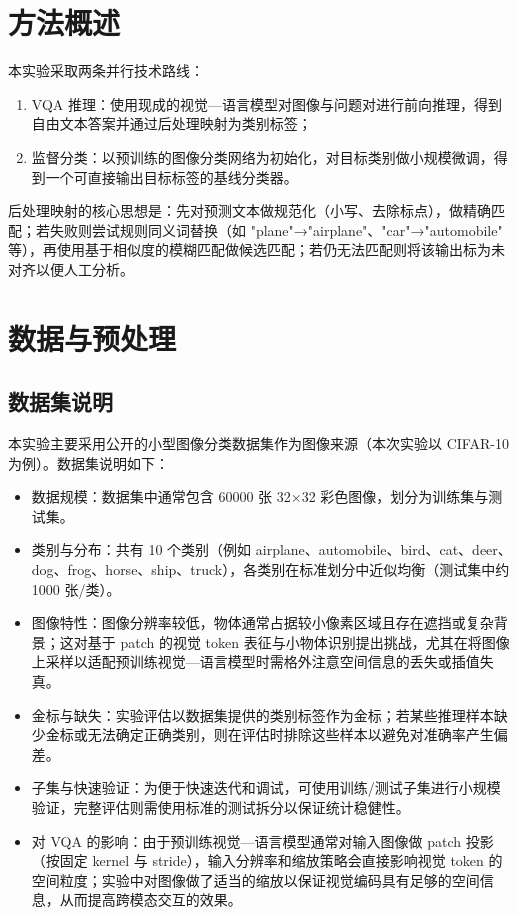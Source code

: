 \section{方法概述}
本实验采取两条并行技术路线：
\begin{enumerate}
  \item VQA 推理：使用现成的视觉—语言模型对图像与问题对进行前向推理，得到自由文本答案并通过后处理映射为类别标签；
  \item 监督分类：以预训练的图像分类网络为初始化，对目标类别做小规模微调，得到一个可直接输出目标标签的基线分类器。
\end{enumerate}

后处理映射的核心思想是：先对预测文本做规范化（小写、去除标点），做精确匹配；若失败则尝试规则同义词替换（如 "plane"→"airplane"、"car"→"automobile" 等），再使用基于相似度的模糊匹配做候选匹配；若仍无法匹配则将该输出标为未对齐以便人工分析。

\section{数据与预处理}
\subsection{数据集说明}
本实验主要采用公开的小型图像分类数据集作为图像来源（本次实验以 CIFAR-10 为例）。数据集说明如下：
\begin{itemize}
  \item 数据规模：数据集中通常包含 60000 张 32$\times$32 彩色图像，划分为训练集与测试集。
  \item 类别与分布：共有 10 个类别（例如 airplane、automobile、bird、cat、deer、dog、frog、horse、ship、truck），各类别在标准划分中近似均衡（测试集中约 1000 张/类）。
  \item 图像特性：图像分辨率较低，物体通常占据较小像素区域且存在遮挡或复杂背景；这对基于 patch 的视觉 token 表征与小物体识别提出挑战，尤其在将图像上采样以适配预训练视觉—语言模型时需格外注意空间信息的丢失或插值失真。
  \item 金标与缺失：实验评估以数据集提供的类别标签作为金标；若某些推理样本缺少金标或无法确定正确类别，则在评估时排除这些样本以避免对准确率产生偏差。
  \item 子集与快速验证：为便于快速迭代和调试，可使用训练/测试子集进行小规模验证，完整评估则需使用标准的测试拆分以保证统计稳健性。
  \item 对 VQA 的影响：由于预训练视觉—语言模型通常对输入图像做 patch 投影（按固定 kernel 与 stride），输入分辨率和缩放策略会直接影响视觉 token 的空间粒度；实验中对图像做了适当的缩放以保证视觉编码具有足够的空间信息，从而提高跨模态交互的效果。
\end{itemize}

